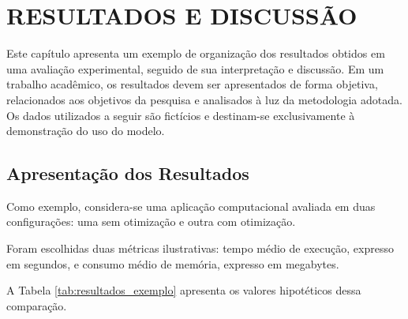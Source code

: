 

\chapter[Resultados e Discussão]{RESULTADOS E DISCUSSÃO}
\label{sec:resultados-discussao}


Este capítulo apresenta um exemplo de organização dos resultados obtidos em uma avaliação experimental, seguido de sua interpretação e discussão. Em um trabalho acadêmico, os resultados devem ser apresentados de forma objetiva, relacionados aos objetivos da pesquisa e analisados à luz da metodologia adotada. Os dados utilizados a seguir são fictícios e destinam-se exclusivamente à demonstração do uso do modelo.

\section{Apresentação dos Resultados}

Como exemplo, considera-se uma aplicação computacional avaliada em duas configurações:
uma sem otimização e outra com otimização.

Foram escolhidas duas métricas ilustrativas: tempo médio de execução, expresso em segundos,
e consumo médio de memória, expresso em megabytes.

A Tabela \ref{tab:resultados_exemplo}
apresenta os valores hipotéticos dessa comparação.

